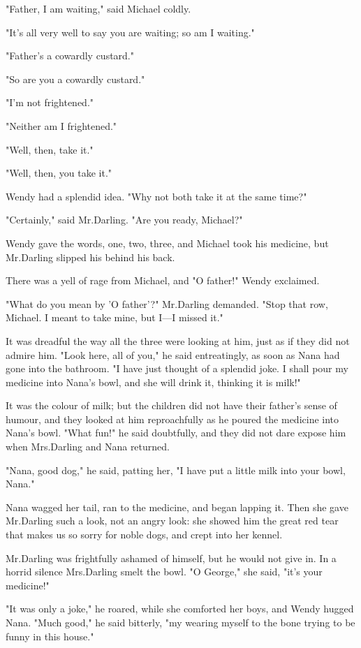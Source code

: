 "Father, I am waiting," said Michael coldly.

"It's all very well to say you are waiting;
so am I waiting."

"Father's a cowardly custard."

"So are you a cowardly custard."

"I'm not frightened."

"Neither am I frightened."

"Well, then, take it."

"Well, then, you take it."

Wendy had a splendid idea.
"Why not both take it at the same time?"

"Certainly," said Mr.\@ Darling.
"Are you ready, Michael?"

Wendy gave the words, one, two, three, and Michael took his medicine,
but Mr.\@ Darling slipped his behind his back.

There was a yell of rage from Michael,
and "O father!\@" Wendy exclaimed.

"What do you mean by 'O father'?\@" Mr.\@ Darling demanded.
"Stop that row, Michael.
I meant to take mine, but I—I missed it."

It was dreadful the way all the three were looking at him,
just as if they did not admire him.
"Look here, all of you," he said entreatingly,
as soon as Nana had gone into the bathroom.
"I have just thought of a splendid joke.
I shall pour my medicine into Nana's bowl, and she will drink it, thinking it is milk!"

It was the colour of milk;
but the children did not have their father's sense of humour,
and they looked at him reproachfully as he poured the medicine into Nana's bowl.
"What fun!\@" he said doubtfully, and they did not dare expose him when Mrs.\@ Darling and Nana returned.

"Nana, good dog," he said, patting her, "I have put a little milk into your bowl, Nana."

Nana wagged her tail, ran to the medicine, and began lapping it.
Then she gave Mr.\@ Darling such a look, not an angry look:
she showed him the great red tear that makes us so sorry for noble dogs,
and crept into her kennel.

Mr.\@ Darling was frightfully ashamed of himself, but he would not give in.
In a horrid silence Mrs.\@ Darling smelt the bowl.
"O George," she said, "it's your medicine!"

"It was only a joke," he roared,
while she comforted her boys, and Wendy hugged Nana.
"Much good," he said bitterly, "my wearing myself to the bone trying to be funny in this house."

